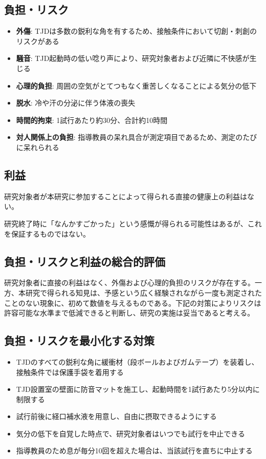 \documentclass{kyodai-protocol}
\begin{document}
\subsection{負担・リスク}

\begin{itemize}
\item \textbf{外傷}: TJDは多数の鋭利な角を有するため、接触条件において切創・刺創のリスクがある
\item \textbf{騒音}: TJD起動時の低い唸り声により、研究対象者および近隣に不快感が生じる
\item \textbf{心理的負担}: 周囲の空気がとてつもなく重苦しくなることによる気分の低下
\item \textbf{脱水}: 冷や汗の分泌に伴う体液の喪失
\item \textbf{時間的拘束}: 1試行あたり約30分、合計約10時間
\item \textbf{対人関係上の負担}: 指導教員の呆れ具合が測定項目であるため、測定のたびに呆れられる
\end{itemize}

\subsection{利益}

研究対象者が本研究に参加することによって得られる直接の健康上の利益はない。

研究終了時に「なんかすごかった」という感慨が得られる可能性はあるが、これを保証するものではない。

\subsection{負担・リスクと利益の総合的評価}

研究対象者に直接の利益はなく、外傷および心理的負担のリスクが存在する。一方、本研究で得られる知見は、予感という広く経験されながら一度も測定されたことのない現象に、初めて数値を与えるものである。下記の対策によりリスクは許容可能な水準まで低減できると判断し、研究の実施は妥当であると考える。

\subsection{負担・リスクを最小化する対策}

\begin{itemize}
\item TJDのすべての鋭利な角に緩衝材（段ボールおよびガムテープ）を装着し、接触条件では保護手袋を着用する
\item TJD設置室の壁面に防音マットを施工し、起動時間を1試行あたり5分以内に制限する
\item 試行前後に経口補水液を用意し、自由に摂取できるようにする
\item 気分の低下を自覚した時点で、研究対象者はいつでも試行を中止できる
\item 指導教員のため息が毎分10回を超えた場合は、当該試行を直ちに中止する
\end{itemize}
\end{document}
